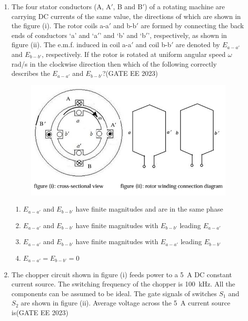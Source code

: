 \documentclass[a4paper,12pt]{exam}
\theoremstyle{remark}
\begin{document}
\begin{enumerate}
\item The four stator conductors (A, A$'$, B and B$'$) of a rotating machine are carrying DC currents of the same value, the directions of which are shown in the figure (i). The rotor coils a-a$'$ and b-b$'$ are formed by connecting the back ends of conductors ‘a’ and ‘a$'$’ and ‘b’ and ‘b$'$’, respectively, as shown in figure (ii). The e.m.f. induced in coil a-a$'$ and coil b-b$'$ are denoted by $E_{a-a'}$ and $E_{b-b'}$, respectively. If the rotor is rotated at uniform angular speed $\omega$ rad/s in the clockwise direction then which of the following correctly describes the $E_{a-a'}$ and $E_{b-b'}$?\hfill{(GATE EE 2023)}
\begin{figure}[H]
    \centering
    \includegraphics[width=0.85\columnwidth]{figs/Screenshot_17-8-2025_205746_.jpeg}
    \caption{}
    \label{fig:placeholder}
\end{figure}
\begin{multicols}{4}
\begin{enumerate}
    \item $E_{a-a'}$ and $E_{b-b'}$ have finite magnitudes and are in the same phase
    \item $E_{a-a'}$ and $E_{b-b'}$ have finite magnitudes with $E_{b-b'}$ leading $E_{a-a'}$
    \item $E_{a-a'}$ and $E_{b-b'}$ have finite magnitudes with $E_{a-a'}$ leading $E_{b-b'}$
    \item $E_{a-a'} = E_{b-b'} = 0$
\end{enumerate}
\end{multicols}
\newpage
\item The chopper circuit shown in figure (i) feeds power to a 5~A DC constant current source. The switching frequency of the chopper is 100~kHz. All the components can be assumed to be ideal. The gate signals of switches $S_1$ and $S_2$ are shown in figure (ii). Average voltage across the 5~A current source is\hfill{(GATE EE 2023)}

\end{enumerate}
\end{document}
